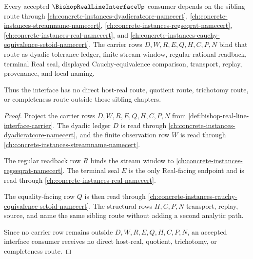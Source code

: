 \begin{theorem}
\label{thm:bishop-real-line-interface-dyadic-stream-sibling-route}
Every accepted $\BishopRealLineInterfaceUp$ consumer depends on the sibling route through \autoref{ch:concrete-instances-dyadicratcore-namecert}, \autoref{ch:concrete-instances-streamname-namecert}, \autoref{ch:concrete-instances-regseqrat-namecert}, \autoref{ch:concrete-instances-real-namecert}, and \autoref{ch:concrete-instances-cauchy-equivalence-setoid-namecert}. The carrier rows $D,W,R,E,Q,H,C,P,N$ bind that route as dyadic tolerance ledger, finite stream window, regular rational readback, terminal Real seal, displayed Cauchy-equivalence comparison, transport, replay, provenance, and local naming.

Thus the interface has no direct host-real route, quotient route, trichotomy route, or completeness route outside those sibling chapters.
\end{theorem}
\begin{proof}
Project the carrier rows $D,W,R,E,Q,H,C,P,N$ from \autoref{def:bishop-real-line-interface-carrier}. The dyadic ledger $D$ is read through \autoref{ch:concrete-instances-dyadicratcore-namecert}, and the finite observation row $W$ is read through \autoref{ch:concrete-instances-streamname-namecert}.

The regular readback row $R$ binds the stream window to \autoref{ch:concrete-instances-regseqrat-namecert}. The terminal seal $E$ is the only Real-facing endpoint and is read through \autoref{ch:concrete-instances-real-namecert}.

The equality-facing row $Q$ is then read through \autoref{ch:concrete-instances-cauchy-equivalence-setoid-namecert}. The structural rows $H,C,P,N$ transport, replay, source, and name the same sibling route without adding a second analytic path.

Since no carrier row remains outside $D,W,R,E,Q,H,C,P,N$, an accepted interface consumer receives no direct host-real, quotient, trichotomy, or completeness route.
\end{proof}

